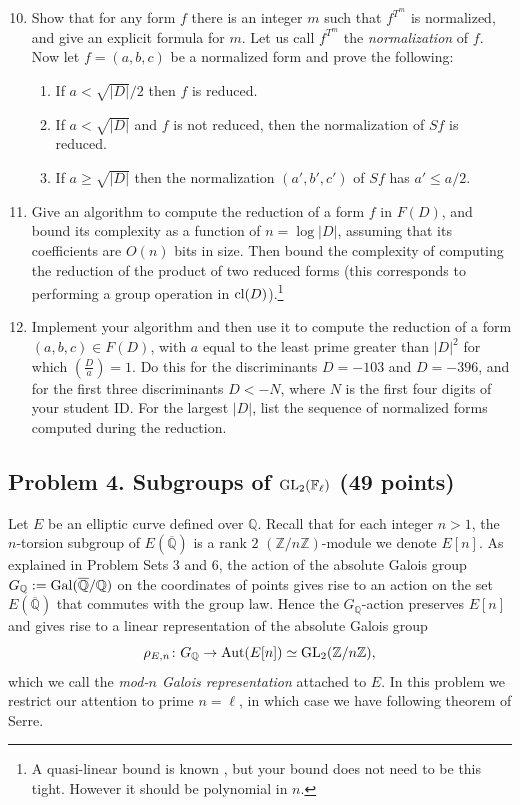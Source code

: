 \documentclass[11pt]{article}
\newcommand{\F}{\mathbb{F}}
\newcommand{\Q}{\mathbb{Q}}
\newcommand{\Qbar}{\overline{\mathbb{Q}}}
\newcommand{\Z}{\mathbb{Z}}
\newcommand{\Aut}{{\rm Aut}}
\newcommand{\Gal}{{\rm Gal}}
\newcommand{\GL}{{\rm GL}}
\newcommand{\cl}{{\rm cl}}
\theoremstyle{definition}
\begin{document}
\begin{enumerate}[{\bf (a)}]
\setcounter{enumi}{9}
\item Show that for any form $f$ there is an integer $m$ such that $f^{T^m}$ is normalized, and give an explicit formula for $m$.
Let us call $f^{T^m}$ the \emph{normalization} of $f$.
Now let $f=(a,b,c)$ be a normalized form and prove the following:
\begin{enumerate}
\item If $a < \sqrt{|D|}/2$ then $f$ is reduced.
\item If $a<\sqrt{|D|}$ and $f$ is not reduced, then the normalization of $Sf$ is reduced.
\item If $a \ge \sqrt{|D|}$ then the normalization $(a',b',c')$ of $Sf$ has $a'\le a/2$.
\end{enumerate}

\item
Give an algorithm to compute the reduction of a form $f$ in $F(D)$, and bound its complexity as a function of $n=\log|D|$, assuming that its coefficients are $O(n)$ bits in size.
Then bound the complexity of computing the reduction of the product of two reduced forms (this corresponds to performing a group operation in $\cl(D)$).\footnote{A quasi-linear bound is known \cite{schonhage}, but your bound does not need to be this tight.  However it should be polynomial  in $n$.}

\item
Implement your algorithm and then use it to compute the reduction of a form $(a,b,c)\in F(D)$, with $a$ equal to the least prime greater than $|D|^2$ for which $(\frac{D}{a})=1$.  Do this for the discriminants $D=-103$ and $D=-396$, and for the first three discriminants $D<-N$, where $N$ is the first four digits of your student ID.   For the largest $|D|$, list the sequence of normalized forms computed during the reduction.
\end{enumerate}


\subsection*{Problem 4. Subgroups of $\GL_2(\F_\ell)$ (49 points)}

Let $E$ be an elliptic curve defined over $\Q$.
Recall that for each integer $n>1$, the $n$-torsion subgroup of $E(\Qbar)$ is a rank $2$ $(\Z/n \Z)$-module we denote $E[n]$.
As explained in Problem Sets 3 and 6, the action of the absolute Galois group $G_\Q := \Gal(\Qbar/\Q)$ on the coordinates of points gives rise to an action on the set $E(\Qbar)$ that commutes with the group law.
Hence the $G_\Q$-action preserves $E[n]$ and gives rise to a linear representation of the absolute Galois group
\[
\rho_{E,n} \colon G_\Q \to \Aut(E[n]) \simeq \GL_2(\Z/n\Z),
\]
which we call the \emph{mod-$n$ Galois representation} attached to $E$.
In this problem we restrict our attention to prime $n  = \ell$, in which case we have following theorem of Serre.
\end{document}
